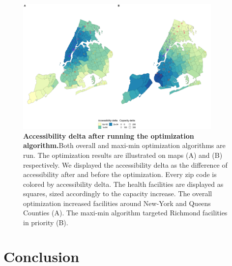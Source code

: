 \begin{figure}[H]
    \includegraphics[width=0.9\textwidth]{images/camion-ny/fig3.png}
    \centering
    \caption{ \textbf{Accessibility delta after running the optimization
            algorithm.}Both overall and maxi-min optimization algorithms are run.
        The optimization results are illustrated on maps (A) and (B)
        respectively. We displayed the accessibility delta as the difference of
        accessibility after and before the optimization. Every zip code is
        colored by accessibility delta. The health facilities are displayed as
        squares, sized accordingly to the capacity increase. The overall
        optimization increased facilities around New-York and Queens Counties
        (A). The maxi-min algorithm targeted Richmond facilities in priority
        (B). }
    \label{fig:camion-ny-optim}
\end{figure}

\section{Conclusion}


